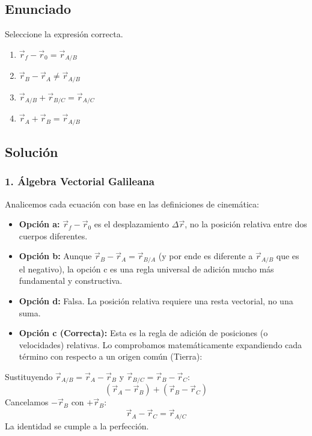\documentclass[12pt, a4paper]{article}
\begin{document}
\newpage


\subsection*{Enunciado}
Seleccione la expresión correcta.
\begin{enumerate}[label=\alph*)]
    \item $\vec{r}_f - \vec{r}_0 = \vec{r}_{A/B}$
    \item $\vec{r}_B - \vec{r}_A \neq \vec{r}_{A/B}$
    \item $\vec{r}_{A/B} + \vec{r}_{B/C} = \vec{r}_{A/C}$
    \item $\vec{r}_A + \vec{r}_B = \vec{r}_{A/B}$
\end{enumerate}

\subsection*{Solución}

\subsubsection*{1. Álgebra Vectorial Galileana}
Analicemos cada ecuación con base en las definiciones de cinemática:
\begin{itemize}
    \item \textbf{Opción a:} $\vec{r}_f - \vec{r}_0$ es el desplazamiento $\Delta \vec{r}$, no la posición relativa entre dos cuerpos diferentes.
    \item \textbf{Opción b:} Aunque $\vec{r}_B - \vec{r}_A = \vec{r}_{B/A}$ (y por ende es diferente a $\vec{r}_{A/B}$ que es el negativo), la opción c es una regla universal de adición mucho más fundamental y constructiva.
    \item \textbf{Opción d:} Falsa. La posición relativa requiere una resta vectorial, no una suma.
    \item \textbf{Opción c (Correcta):} Esta es la regla de adición de posiciones (o velocidades) relativas. Lo comprobamos matemáticamente expandiendo cada término con respecto a un origen común (Tierra):
\end{itemize}
Sustituyendo $\vec{r}_{A/B} = \vec{r}_A - \vec{r}_B$ y $\vec{r}_{B/C} = \vec{r}_B - \vec{r}_C$:
$$ (\vec{r}_A - \vec{r}_B) + (\vec{r}_B - \vec{r}_C) $$
Cancelamos $-\vec{r}_B$ con $+\vec{r}_B$:
$$ \vec{r}_A - \vec{r}_C = \vec{r}_{A/C} $$
La identidad se cumple a la perfección.
\end{document}
